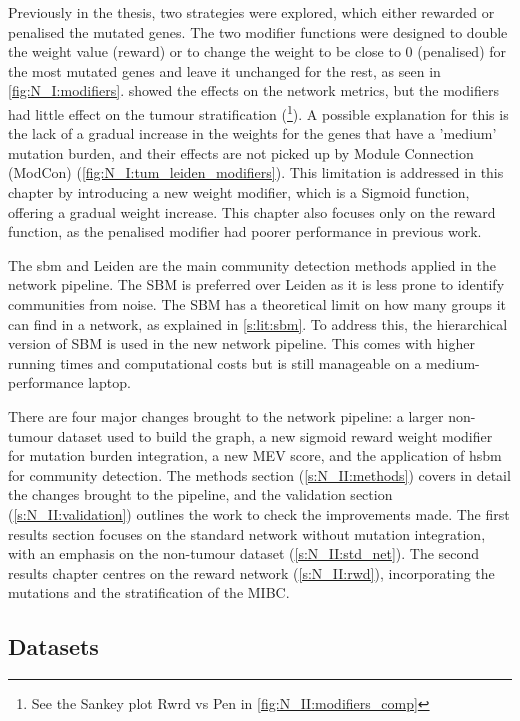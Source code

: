 Previously in the thesis, two strategies were explored, which either rewarded or penalised the mutated genes. The two modifier functions were designed to double the weight value (reward) or to change the weight to be close to 0 (penalised) for the most mutated genes and leave it unchanged for the rest, as seen in \cref{fig:N_I:modifiers}.  showed the effects on the network metrics, but the modifiers had little effect on the tumour stratification (\footnote{See the Sankey plot Rwrd vs Pen in \cref{fig:N_II:modifiers_comp}}). A possible explanation for this is the lack of a gradual increase in the weights for the genes that have a 'medium' mutation burden, and their effects are not picked up by Module Connection (ModCon) (\cref{fig:N_I:tum_leiden_modifiers}). This limitation is addressed in this chapter by introducing a new weight modifier, which is a Sigmoid function, offering a gradual weight increase. This chapter also focuses only on the reward function, as the penalised modifier had poorer performance in previous work.


The \acrfull{sbm} and Leiden are the main community detection methods applied in the network pipeline. The SBM is preferred over Leiden as it is less prone to identify communities from noise. The SBM has a theoretical limit on how many groups it can find in a network, as explained in \cref{s:lit:sbm}. To address this, the hierarchical version of SBM is used in the new network pipeline. This comes with higher running times and computational costs but is still manageable on a medium-performance laptop.

There are four major changes brought to the network pipeline: a larger non-tumour dataset used to build the graph, a new sigmoid reward weight modifier for mutation burden integration, a new MEV score, and the application of \acrfull{hsbm} for community detection. The methods section (\ref{s:N_II:methods}) covers in detail the changes brought to the pipeline, and the validation section (\ref{s:N_II:validation}) outlines the work to check the improvements made. The first results section focuses on the standard network without mutation integration, with an emphasis on the non-tumour dataset (\cref{s:N_II:std_net}). The second results chapter centres on the reward network (\cref{s:N_II:rwd}), incorporating the mutations and the stratification of the MIBC.


\subsection*{Datasets}

